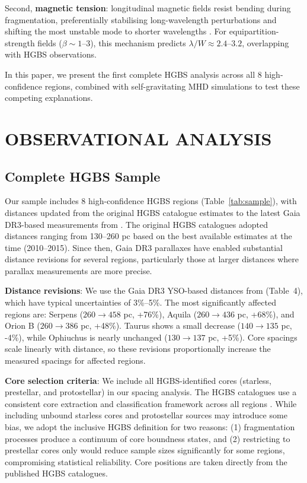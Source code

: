 \documentclass[twocolumn]{mnras}
\begin{document}
Second, \textbf{magnetic tension}: longitudinal magnetic fields resist bending during fragmentation, preferentially stabilising long-wavelength perturbations and shifting the most unstable mode to shorter wavelengths \citep{Nakamura1993}. For equipartition-strength fields ($\beta \sim 1$--$3$), this mechanism predicts $\lambda/W \approx 2.4$--$3.2$, overlapping with HGBS observations.

In this paper, we present the first complete HGBS analysis across all 8 high-confidence regions, combined with self-gravitating MHD simulations to test these competing explanations.

\section{OBSERVATIONAL ANALYSIS}

\subsection{Complete HGBS Sample}

Our sample includes 8 high-confidence HGBS regions (Table~\ref{tab:sample}), with distances updated from the original HGBS catalogue estimates to the latest Gaia DR3-based measurements from \citet{Zhang2023}. The original HGBS catalogues \citep{Konyves2015, Konyves2020, Andre2016, Ladjelate2020} adopted distances ranging from 130--260 pc based on the best available estimates at the time (2010--2015). Since then, Gaia DR3 parallaxes have enabled substantial distance revisions for several regions, particularly those at larger distances where parallax measurements are more precise.

\textbf{Distance revisions}: We use the Gaia DR3 YSO-based distances from \citet{Zhang2023} (Table~4), which have typical uncertainties of 3\%--5\%. The most significantly affected regions are: Serpens ($260 \to 458$ pc, +76\%), Aquila ($260 \to 436$ pc, +68\%), and Orion B ($260 \to 386$ pc, +48\%). Taurus shows a small decrease ($140 \to 135$ pc, -4\%), while Ophiuchus is nearly unchanged ($130 \to 137$ pc, +5\%). Core spacings scale linearly with distance, so these revisions proportionally increase the measured spacings for affected regions.

\textbf{Core selection criteria}: We include all HGBS-identified cores (starless, prestellar, and protostellar) in our spacing analysis. The HGBS catalogues use a consistent core extraction and classification framework across all regions \citep{Konyves2015, Konyves2020}. While including unbound starless cores and protostellar sources may introduce some bias, we adopt the inclusive HGBS definition for two reasons: (1) fragmentation processes produce a continuum of core boundness states, and (2) restricting to prestellar cores only would reduce sample sizes significantly for some regions, compromising statistical reliability. Core positions are taken directly from the published HGBS catalogues.
\end{document}
